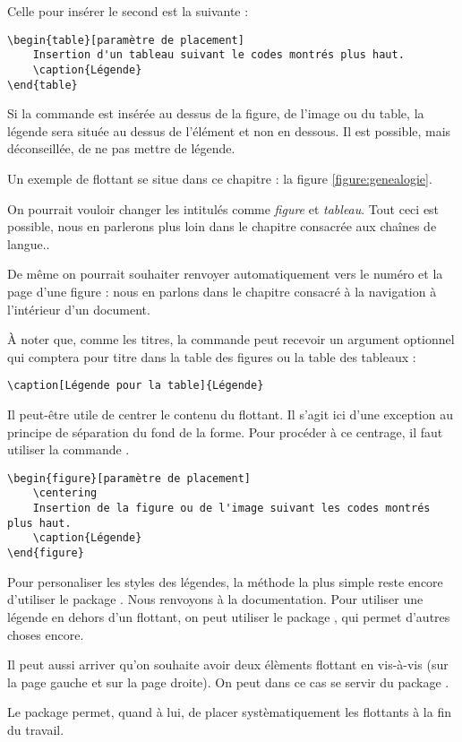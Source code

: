 Celle pour insérer le second est la suivante :
\begin{verbatim}
\begin{table}[paramètre de placement]
	Insertion d'un tableau suivant le codes montrés plus haut.
	\caption{Légende}
\end{table} 
\end{verbatim}

Si la commande  est insérée au dessus de la figure, de l'image ou du table, la légende sera située au dessus de l'élément et non en dessous. Il est possible, mais déconseillée, de ne pas mettre de légende.

Un exemple de flottant se situe  dans ce chapitre : la figure \ref{figure:genealogie}.
\begin{attention}
	On pourrait vouloir changer les intitulés comme \emph{figure} et \emph{tableau}. Tout ceci est possible, nous en parlerons plus loin dans le chapitre consacrée aux chaînes de langue..
	
	De même on pourrait souhaiter renvoyer automatiquement vers le numéro et la page d'une figure : nous en parlons dans le chapitre consacré à la navigation à l'intérieur d'un document.
\end{attention}

À noter que, comme les titres, la commande  peut recevoir un argument optionnel qui comptera pour titre dans la table des figures ou la table des tableaux :

\begin{verbatim}
\caption[Légende pour la table]{Légende}
\end{verbatim}

\begin{anedocte}

Il peut-être utile de centrer le contenu du flottant. Il s'agit ici d'une exception au principe de séparation du fond de la forme. Pour procéder à ce centrage, il faut utiliser la commande .

\begin{verbatim}
\begin{figure}[paramètre de placement]
	\centering
	Insertion de la figure ou de l'image suivant les codes montrés plus haut.
	\caption{Légende}
\end{figure} 
\end{verbatim}


Pour personaliser les styles des légendes, la méthode la plus simple reste encore d'utiliser le package . Nous renvoyons à la documentation.
Pour utiliser une légende en dehors d'un flottant, on peut utiliser le package , qui permet d'autres choses encore.

Il peut aussi arriver qu'on souhaite avoir deux élèments flottant en vis-à-vis (sur la page gauche et sur la page droite). On peut dans ce cas se servir du package .

Le package  permet, quand à lui, de placer systèmatiquement les flottants à la fin du travail.
\end{anedocte}



